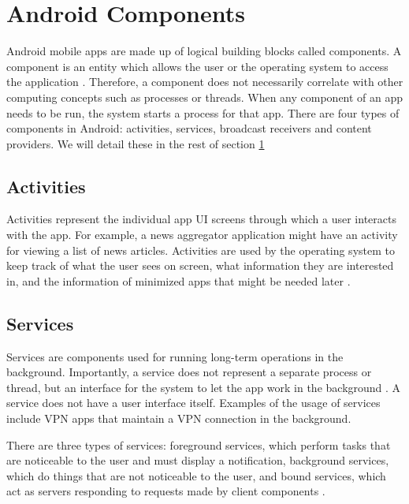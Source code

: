     \section{Android Components}
        \label{sec:android_components}
        
    Android mobile apps are made up of logical building blocks called components. A component is an entity which allows the user or the operating system to access the application \cite{android_app_fundamentals}. Therefore, a component does not necessarily correlate with other computing concepts such as processes or threads. When any component of an app needs to be run, the system starts a process for that app. There are four types of components in Android: activities, services, broadcast receivers and content providers. We will detail these in the rest of section \ref{sec:android_components}
    
    \subsection{Activities}
        \label{subsec:activities}
        
    Activities represent the individual app UI screens through which a user interacts with the app. For example, a news aggregator application might have an activity for viewing a list of news articles. Activities are used by the operating system to keep track of what the user sees on screen, what information they are interested in, and the information of minimized apps that might be needed later \cite{android_app_fundamentals}.
    
    \subsection{Services}
        \label{subsec:services}
        
    Services are components used for running long-term operations in the background. Importantly, a service does not represent a separate process or thread, but an interface for the system to let the app work in the background \cite{whats_is_a_service}. A service does not have a user interface itself. Examples of the usage of services include VPN apps that maintain a VPN connection in the background.
    
    There are three types of services: foreground services, which perform tasks that are noticeable to the user and must display a notification, background services, which do things that are not noticeable to the user, and bound services, which act as servers responding to requests made by client components \cite{services_overview}.
    
